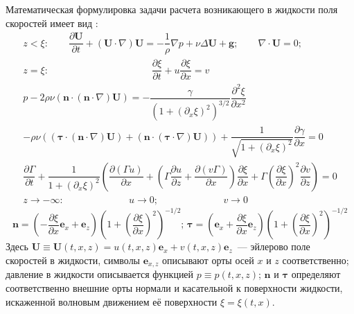 Математическая формулировка задачи расчета возникающего в жидкости поля скоростей имеет вид \parencite{BelonozhkoPav2004}:
\begin{gather}
z<\xi: \qquad  \dfrac{\partial \mathbf{U}}{\partial t}+\left( \mathbf{U} \cdot \nabla \right) \mathbf{U}=-\dfrac{1}{\rho} \nabla p+\nu \Delta \mathbf{U}+\mathbf{g}; \qquad  \nabla \cdot \mathbf{U}=0; \qquad \label{NSPAV}
\\
z=\xi: \mspace{190mu} \dfrac{\partial \xi}{\partial t}+u \dfrac{\partial \xi}{\partial x}=v\mspace{190mu} \label{GU1PAV}
\\
p-2 \rho \nu \left( \mathbf{n} \cdot \left( \mathbf{n} \cdot \nabla \right) \mathbf{U} \right) = - \dfrac{\gamma}{\left( 1+\left( \partial_{x}\xi \right)^{2} \right)^{3/2}} \dfrac{\partial^{2} \xi}{\partial x^{2}} \label{GU2PAV}
\\
-\rho \nu \left( \left( \boldsymbol{\tau} \cdot \left( \mathbf{n} \cdot \nabla \right) \mathbf{U} \right) +\left( \mathbf{n} \cdot \left( \boldsymbol{\tau} \cdot \nabla \right) \mathbf{U} \right) \right)+\dfrac{1}{\sqrt{1+\left( \partial_{x} \xi \right)^{2}}}\dfrac{\partial \gamma}{\partial x}=0 \label{GU3PAV}
\\
\dfrac{\partial \Gamma}{\partial t}+\dfrac{1}{1+\left( \partial_{x}\xi \right)^{2}}\left( \dfrac{\partial \left( \Gamma u \right)}{\partial x}+\left( \Gamma \dfrac{\partial u}{\partial z}+ \dfrac{\partial \left( v \Gamma \right)}{\partial x} \right) \dfrac{\partial \xi}{\partial x} + \Gamma \left( \dfrac{\partial \xi}{\partial x} \right)^{2} \dfrac{\partial v}{\partial z} \right) = 0 \label{GU4PAV}
\\
z \rightarrow - \infty:\mspace{120mu} u \rightarrow 0; \mspace{120mu} v \rightarrow 0 \mspace{120mu} \label{BeskUslPAV}
\end{gather}
\begin{equation*}
\mathbf{n}=\left( -\dfrac{\partial \xi}{\partial x} \mathbf{e}_{x}+\mathbf{e}_{z}\right) \left( 1+\left( \dfrac{\partial \xi}{\partial x} \right)^{2} \right)^{-1/2}; \, \boldsymbol{\tau} = \left( \mathbf{e}_{x}+\dfrac{\partial \xi}{\partial x}\mathbf{e}_{z}\right) \left( 1+\left( \dfrac{\partial \xi}{\partial x} \right)^{2} \right)^{-1/2}
\end{equation*}
Здесь $ \mathbf{U} \equiv \mathbf{U} \left( t, x, z \right)=u\left( t, x, z \right) \mathbf{e}_{x} + v\left( t, x, z \right) \mathbf{e}_{z}$~--- эйлерово поле скоростей в жидкости, символы $ \mathbf{e}_{x, z} $ описывают орты осей $ x $ и $ z $ соответственно; давление в жидкости описывается функцией $ p \equiv p\left( t, x, z \right)  $; $ \mathbf{n} $ и $ \boldsymbol{\tau} $ определяют соответственно  внешние орты нормали и касательной к поверхности жидкости, искаженной волновым движением её поверхности  $ \xi = \xi \left( t, x \right) $. 

